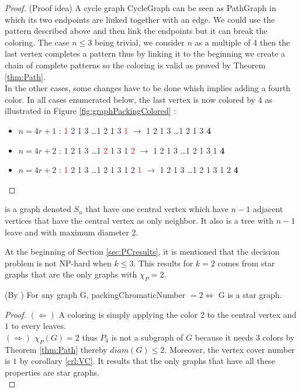 \begin{proof}
(Proof idea)
A cycle graph \gls{CycleGraph} can be seen as \gls{PathGraph} in which its two endpoints are linked together with an edge. We could use the pattern described above and then link the endpoints but it can break the coloring. The case $n \leq 3$ being trivial, we consider $n$ as a multiple of 4 then the last vertex completes a pattern thus by linking it to the beginning we create a chain of complete patterns so the coloring is valid as proved by Theorem \ref{thm:Path}. \\
In the other cases, some changes  have to be done which implies adding a fourth color. In all cases enumerated below, the last vertex is now colored by 4 as illustrated in Figure \ref{fig:graphPackingColored} :

\begin{itemize}
\item $n = 4r + 1$ : \textcolor{red}{1}  2 1 3 \dots 1 2 1 3 \textcolor{red}{1}  $\longrightarrow$  1 2 1 3 \dots 1 2 1 3 \textbf{4}
\item $n = 4r + 2$ : 1 2 1 3 \dots 1  \textcolor{red}{2}  1 3 1 \textcolor{red}{2} $\longrightarrow$  1 2 1 3 \dots 1 2 1 3 1 \textbf{4}
\item $n = 4r + 2$ : \textcolor{red}{1} 2 1 3 \dots 1 2 1 3 1 2 \textcolor{red}{1} $\longrightarrow$  1 2 1 3 \dots 1 2 1 3 1 2 \textbf{4}
\end{itemize}

\end{proof}

\begin{mydef}
\label{def:starGraph}
 is a graph denoted $S_n$ that have one central vertex which have $n-1$ adjacent vertices that have the central vertex as only neighbor. It also is a tree with $n-1$ leave and with maximum diameter 2.
\end{mydef}

At the beginning of Section \ref{sec:PCresults}, it is mentioned that the decision problem is not NP-hard when $k \leq 3$. This results for $k=2$ comes from star graphs that are the only graphs with $\chi_P = 2$.


\begin{thm}(By \cite{broadcastchromatic})
For any graph G, \gls{packingChromaticNumber} $ = 2 \iff $ G is a star graph.
\end{thm}

\begin{proof}
$(\Leftarrow)$ A coloring is simply applying the color 2 to the central vertex and $1$ to every leaves.\\
$(\Rightarrow)$ $\chi_P(G)=2$ thus $P_4$ is not a subgraph of $G$ because it needs 3 colors by Theorem \ref{thm:Path} thereby  $diam(G) \leq 2$. Moreover, the vertex cover number is $1$ by corollary \ref{crl:VC}. It results that the only graphs that have all these properties are star graphs.\\
\end{proof}

